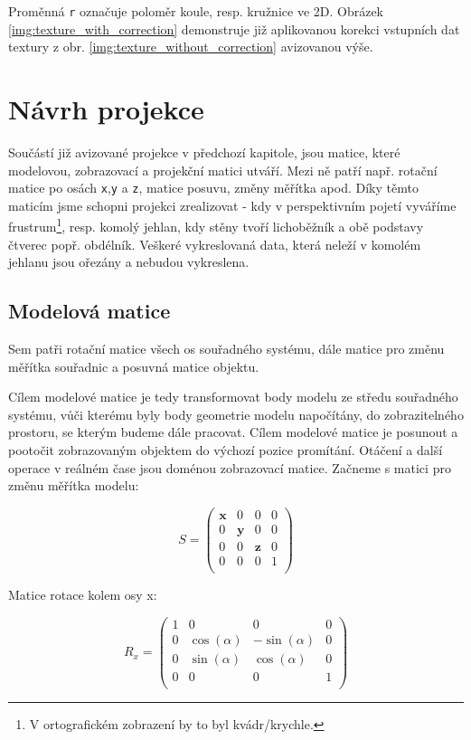 Proměnná \texttt{r} označuje poloměr koule, resp. kružnice ve 2D. Obrázek \ref{img:texture_with_correction} demonstruje již aplikovanou  korekci vstupních dat  textury z obr. \ref{img:texture_without_correction} avizovanou výše.
 

\newpage


\section{Návrh projekce}
Součástí již avizované projekce v předchozí kapitole, jsou matice, které modelovou, zobrazovací a projekční matici utváří. Mezi ně patří např. rotační matice po osách \texttt{x},\texttt{y} a \texttt{z}, matice posuvu, změny měřítka apod. Díky těmto maticím jsme schopni projekci zrealizovat - kdy v perspektivním pojetí vyváříme frustrum\footnote{V ortografickém zobrazení by to byl kvádr/krychle.}, resp. komolý jehlan, kdy stěny tvoří lichoběžník a obě podstavy čtverec popř. obdélník. Veškeré vykreslovaná data, která neleží v komolém jehlanu jsou ořezány  a nebudou vykreslena. 




\subsection{Modelová matice}
Sem patři rotační matice všech os souřadného systému, dále matice pro změnu měřítka souřadnic a posuvná matice objektu.

Cílem modelové matice je tedy transformovat body modelu ze středu souřadného systému, vůči kterému byly body geometrie modelu napočítány, do zobrazitelného prostoru, se kterým budeme dále pracovat. Cílem modelové matice je posunout a pootočit zobrazovaným objektem do výchozí pozice promítání. Otáčení a další operace v reálném čase jsou  doménou zobrazovací matice. Začneme s matici pro změnu měřítka modelu:

$$
S =
\begin{pmatrix} 
\textbf{x} & 0 & 0 & 0\\
0 & \textbf{y} & 0 & 0\\ 
0 & 0 & \textbf{z} & 0\\ 
0 & 0 & 0 & 1\\ 
\end{pmatrix}$$


Matice rotace kolem osy x:

$$
R_{x}=
\begin{pmatrix} 
	1 & 0 & 0 & 0\\
	0 & \cos(\alpha) & -\sin(\alpha) & 0\\ 
	0 & \sin(\alpha) & \cos(\alpha) & 0\\ 
	0 & 0 & 0 & 1\\ 
\end{pmatrix}$$

